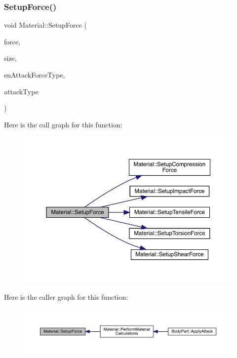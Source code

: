 \subsubsection{\texorpdfstring{Setup\+Force()}{SetupForce()}}
{\footnotesize\ttfamily void Material\+::\+Setup\+Force (\begin{DoxyParamCaption}\item[{float}]{force,  }\item[{float}]{size,  }\item[{\mbox{\hyperlink{_enum_types_8hpp_ad893f9959c49f07fb713f13630b7ee2d}{Attack\+Force\+Type}}}]{en\+Attack\+Force\+Type,  }\item[{\mbox{\hyperlink{_enum_types_8hpp_a904b2f9c8f3951116c343784c59d6afe}{Attack\+Type}}}]{attack\+Type }\end{DoxyParamCaption})\hspace{0.3cm}{\ttfamily [private]}}

Here is the call graph for this function\+:
\nopagebreak
\begin{figure}[H]
\begin{center}
\leavevmode
\includegraphics[width=350pt]{class_material_aa2951eaa13d1f8137cc228ccc9b0c33c_cgraph}
\end{center}
\end{figure}
Here is the caller graph for this function\+:
\nopagebreak
\begin{figure}[H]
\begin{center}
\leavevmode
\includegraphics[width=350pt]{class_material_aa2951eaa13d1f8137cc228ccc9b0c33c_icgraph}
\end{center}
\end{figure}
\mbox{\label{class_material_a0306582d701642b867f9c53c769ffaf7}} 
